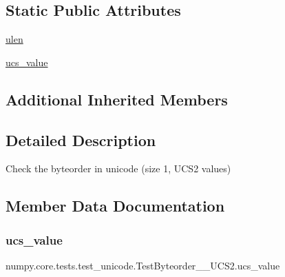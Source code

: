 \subsection*{Static Public Attributes}
\begin{DoxyCompactItemize}
\item 
\hyperlink{classnumpy_1_1core_1_1tests_1_1test__unicode_1_1TestByteorder__1__UCS2_a554d49bf9bd891ed6a6c1e48f78efa80}{ulen}
\item 
\hyperlink{classnumpy_1_1core_1_1tests_1_1test__unicode_1_1TestByteorder__1__UCS2_a14e6d57070e2ab6556816cc2e9f1c583}{ucs\+\_\+value}
\end{DoxyCompactItemize}
\subsection*{Additional Inherited Members}


\subsection{Detailed Description}
\begin{DoxyVerb}Check the byteorder in unicode (size 1, UCS2 values)\end{DoxyVerb}
 

\subsection{Member Data Documentation}
\mbox{\label{classnumpy_1_1core_1_1tests_1_1test__unicode_1_1TestByteorder__1__UCS2_a14e6d57070e2ab6556816cc2e9f1c583}} 
\subsubsection{\texorpdfstring{ucs\+\_\+value}{ucs\_value}}
{\footnotesize\ttfamily numpy.\+core.\+tests.\+test\+\_\+unicode.\+Test\+Byteorder\+\_\+\_\+\+U\+C\+S2.\+ucs\+\_\+value\hspace{0.3cm}{\ttfamily [static]}}

